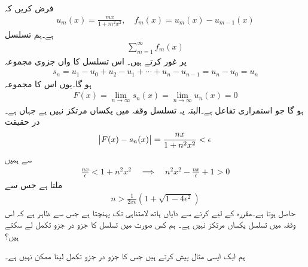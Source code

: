 \quad
فرض کریں کہ
\begin{align*}
u_m(x)=\frac{mx}{1+m^2x^2}, \quad f_m(x)=u_m(x)-u_{m-1}(x)
\end{align*}
ہے۔ہم  تسلسل
\begin{align*}
\sum\limits_{m=1}^{\infty} f_m(x)
\end{align*}
پر غور کرتے ہیں۔ اس تسلسل کا  واں جزوی مجموعہ
\begin{align*}
s_n=u_1-u_0+u_2-u_1+\cdots+u_n-u_{n-1}=u_n-u_0=u_n
\end{align*}
ہو گا۔یوں اس کا مجموعہ 
\begin{align*}
F(x)=\lim_{n\to \infty} s_n(x)=\lim_{n\to \infty} u_n(x)=0
\end{align*}
ہو گا جو استمراری تفاعل ہے۔البتہ یہ تسلسل وقفہ  میں یکساں مرتکز نہیں ہے جہاں  ہے۔در حقیقت 
\begin{align*}
\abs{F(x)-s_n(x)}=\frac{nx}{1+n^2x^2}<\epsilon
\end{align*} 
سے ہمیں 
\begin{align*}
\frac{nx}{\epsilon}<1+n^2x^2 \quad \implies \quad n^2x^2-\frac{nx}{\epsilon}+1>0
\end{align*}
ملتا ہے جس سے
\begin{align*}
n>\frac{1}{2x\epsilon}(1+\sqrt{1-4\epsilon^2})
\end{align*}
حاصل ہوتا ہے۔مقررہ  کے لیے  کرنے سے دایاں ہاتھ لامتناہی تک پہنچتا ہے جس سے ظاہر ہے کہ اس وقفہ میں تسلسل یکساں مرتکز نہیں ہے۔
ہم کس صورت میں تسلسل کا جزو در جزو تکمل لے سکتے ہیں؟

ہم ایک ایسی مثال  پیش کرتے ہیں جس کا جزو در جزو تکمل لینا  ممکن نہیں ہے۔ 


